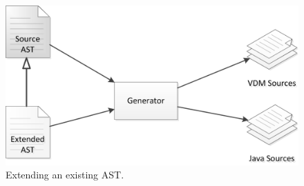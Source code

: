 \documentclass{overturerepchap}
\begin{document}


\begin{figure}[hpt]
\centering
\includegraphics[width=.5\textwidth]{figures/ASTgenerator_extend}
\caption{Extending an existing AST.\label{fig:ASTgenExtend}}
\end{figure}
\end{document}
